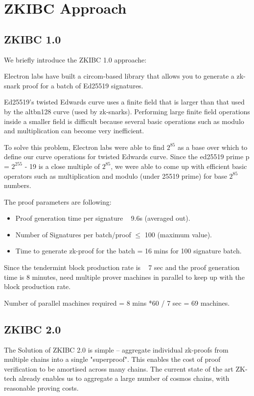 \documentclass{article}
\begin{document}
\section{ZKIBC Approach}

\subsection{ZKIBC 1.0}
We briefly introduce the ZKIBC 1.0 approache:

Electron labs have built a circom-based library that allows you to generate a zk-snark proof for a batch of Ed25519 signatures. 

Ed25519’s twisted Edwards curve uses a finite field that is larger than that used by the altbn128 curve (used by zk-snarks). Performing large finite field operations inside a smaller field is difficult because several basic operations such as modulo and multiplication can become very inefficient.

To solve this problem, Electron labs were able to find $2^{85}$ as a base over which to define our curve operations for twisted Edwards curve. Since the ed25519 prime p = $2^{255}$ - 19 is a close multiple of $2^{85}$, we were able to come up with efficient basic operators such as multiplication and modulo (under 25519 prime) for base $2^{85}$ numbers.

The proof parameters are following:
\begin{itemize}
    \item Proof generation time per signature ~ 9.6s (averaged out).
    \item Number of Signatures per batch/proof $\leq$ 100 (maximum value).
    \item Time to generate zk-proof for the batch = 16 mins for 100 signature batch.
\end{itemize}

Since the tendermint block production rate is ~ 7 sec and the proof generation time is 8 minutes, need multiple prover machines in parallel to keep up with the block production rate.

Number of parallel machines required = 8 mins *60 / 7 sec = 69 machines.



\subsection{ZKIBC 2.0}

The Solution of ZKIBC 2.0 is simple -- aggregate individual zk-proofs from multiple chains into a single "superproof". This enables the cost of proof verification to be amortised across many chains. The current state of the art ZK-tech already enables us to aggregate a large number of cosmos chains, with reasonable proving costs.
\end{document}
